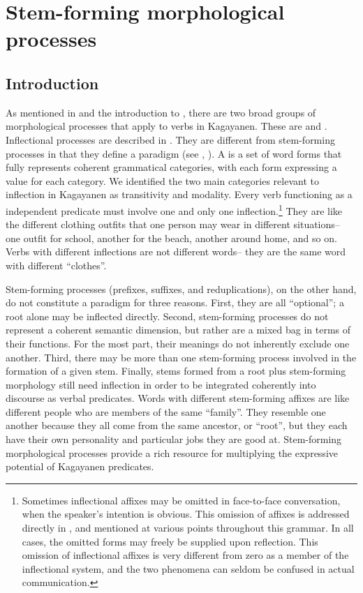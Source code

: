 \chapter{Stem-forming morphological processes}
\label{chap:stemformingprocesses}
\section{Introduction}
\label{sec:introduction-7}

As mentioned in  and the introduction to , there are two broad groups of morphological processes that apply to verbs in Kagayanen. These are  and . Inflectional processes are described in . They are different from stem-forming processes in that they define a paradigm (see , ). A  is a set of word forms that fully represents coherent grammatical categories, with each form expressing a value for each category. We identified the two main categories relevant to inflection in Kagayanen as transitivity and modality. Every verb functioning as a independent predicate must involve one and only one inflection.\footnote{Sometimes inflectional affixes may be omitted in face-to-face conversation, when the speaker’s intention is obvious. This omission of affixes is addressed directly in ,  and mentioned at various points throughout this grammar. In all cases, the omitted forms may freely be supplied upon reflection. This omission of inflectional affixes is very different from zero as a member of the inflectional system, and the two phenomena can seldom be confused in actual communication.} They are like the different clothing outfits that one person may wear in different situations-- one outfit for school, another for the beach, another around home, and so on. Verbs with different inflections are not different words-- they are the same word with different “clothes”.

Stem-forming processes (prefixes, suffixes, and reduplications), on the other hand, do not constitute a paradigm for three reasons. First, they are all “optional”; a root alone may be inflected directly. Second, stem-forming processes do not represent a coherent semantic dimension, but rather are a mixed bag in terms of their functions. For the most part, their meanings do not inherently exclude one another. Third, there may be more than one stem-forming process involved in the formation of a given stem. Finally, stems formed from a root plus stem-forming morphology still need inflection in order to be integrated coherently into discourse as verbal predicates. Words with different stem-forming affixes are like different people who are members of the same “family”. They resemble one another because they all come from the same ancestor, or “root”, but they each have their own personality and particular jobs they are good at. Stem-forming morphological processes provide a rich resource for multiplying the expressive potential of Kagayanen predicates.

